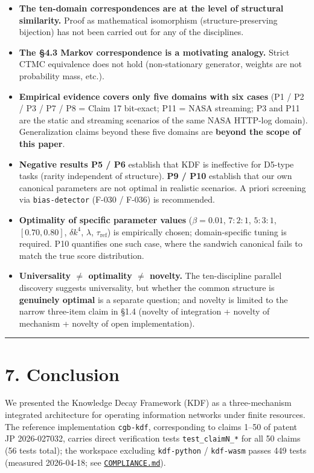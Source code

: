 \begin{itemize}
\item
  \textbf{The ten-domain correspondences are at the level of structural similarity.} Proof as mathematical isomorphism (structure-preserving bijection) has not been carried out for any of the disciplines.
\item
  \textbf{The §4.3 Markov correspondence is a motivating analogy.} Strict CTMC equivalence does not hold (non-stationary generator, weights are not probability mass, etc.).
\item
  \textbf{Empirical evidence covers only five domains with six cases} (P1 / P2 / P3 / P7 / P8 = Claim 17 bit-exact; P11 = NASA streaming; P3 and P11 are the static and streaming scenarios of the same NASA HTTP-log domain). Generalization claims beyond these five domains are \textbf{beyond the scope of this paper}.
\item
  \textbf{Negative results P5 / P6} establish that KDF is ineffective for D5-type tasks (rarity independent of structure). \textbf{P9 / P10} establish that our own canonical parameters are not optimal in realistic scenarios. A priori screening via \texttt{bias-detector} (F-030 / F-036) is recommended.
\item
  \textbf{Optimality of specific parameter values} (\(\beta = 0.01\), \(7:2:1\), \(5:3:1\), \([0.70, 0.80]\), \(\delta k^4\), \(\lambda\), \(\tau_{\text{ref}}\)) is empirically chosen; domain-specific tuning is required. P10 quantifies one such case, where the sandwich canonical fails to match the true score distribution.
\item
  \textbf{Universality \(\neq\) optimality \(\neq\) novelty.} The ten-discipline parallel discovery suggests universality, but whether the common structure is \textbf{genuinely optimal} is a separate question; and novelty is limited to the narrow three-item claim in §1.4 (novelty of integration + novelty of mechanism + novelty of open implementation).
\end{itemize}

\begin{center}\rule{0.5\linewidth}{0.5pt}\end{center}

\section{7. Conclusion}\label{conclusion}

We presented the Knowledge Decay Framework (KDF) as a three-mechanism integrated architecture for operating information networks under finite resources. The reference implementation \texttt{cgb-kdf}, corresponding to claims 1--50 of patent JP 2026-027032, carries direct verification tests \texttt{test\_claimN\_*} for all 50 claims (56 tests total); the workspace excluding \texttt{kdf-python} / \texttt{kdf-wasm} passes 449 tests (measured 2026-04-18; see \href{../patent/COMPLIANCE.md}{\texttt{COMPLIANCE.md}}).


